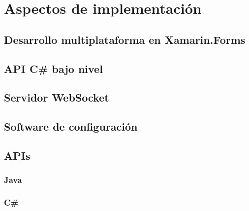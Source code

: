 \section{Aspectos de implementación}

\subsection{Desarrollo multiplataforma en Xamarin.Forms}


\subsection{API C\# bajo nivel}

\subsection{Servidor WebSocket}

\subsection{Software de configuración}

\subsection{APIs}
	
	\subsubsection{Java}
	\subsubsection{C\#}
    